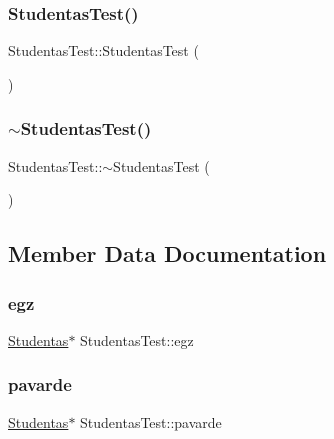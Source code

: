 \subsubsection{\texorpdfstring{StudentasTest()}{StudentasTest()}}
{\footnotesize\ttfamily Studentas\+Test\+::\+Studentas\+Test (\begin{DoxyParamCaption}{ }\end{DoxyParamCaption})\hspace{0.3cm}{\ttfamily [inline]}}

\mbox{\label{struct_studentas_test_a4187afae5e82ae547ebda520d07fed8e}} 
\subsubsection{\texorpdfstring{$\sim$StudentasTest()}{~StudentasTest()}}
{\footnotesize\ttfamily Studentas\+Test\+::$\sim$\+Studentas\+Test (\begin{DoxyParamCaption}{ }\end{DoxyParamCaption})\hspace{0.3cm}{\ttfamily [inline]}}



\subsection{Member Data Documentation}
\mbox{\label{struct_studentas_test_aeb1bd2d7d47a4cb4e17c276732a18960}} 
\subsubsection{\texorpdfstring{egz}{egz}}
{\footnotesize\ttfamily \mbox{\hyperlink{class_studentas}{Studentas}}$\ast$ Studentas\+Test\+::egz}

\mbox{\label{struct_studentas_test_adbe0d0678d35de4a25a56abf97d8a743}} 
\subsubsection{\texorpdfstring{pavarde}{pavarde}}
{\footnotesize\ttfamily \mbox{\hyperlink{class_studentas}{Studentas}}$\ast$ Studentas\+Test\+::pavarde}

